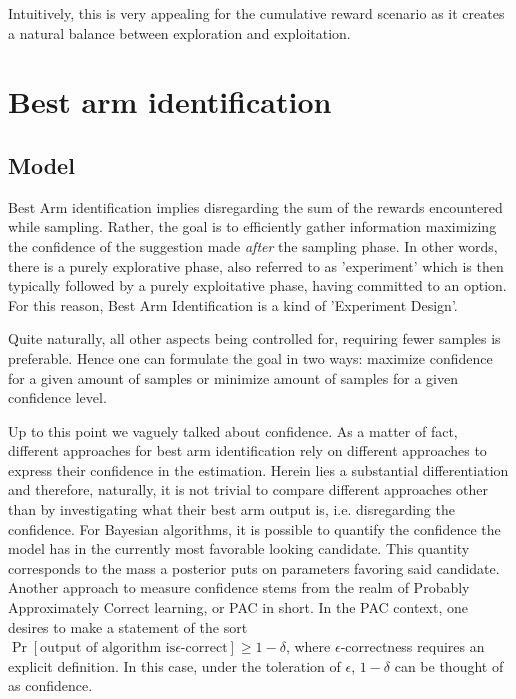 Intuitively, this is very appealing for the cumulative reward scenario as it
creates a natural balance between exploration and exploitation.

\section{Best arm identification}
\subsection{Model}\label{ss:top-1_model}

Best Arm identification implies disregarding the sum of the rewards encountered
while sampling. Rather, the goal is to efficiently gather information maximizing
the confidence of the suggestion made \emph{after} the sampling phase. In other
words, there is a purely explorative phase, also referred to as 'experiment'
which is then typically followed by a purely exploitative phase, having
committed to an option. For this reason, Best Arm Identification is a kind of
'Experiment Design'.

Quite naturally, all other aspects being controlled for, requiring fewer samples
is preferable. Hence one can formulate the goal in two ways: maximize confidence
for a given amount of samples or minimize amount of samples for a given
confidence level.

Up to this point we vaguely talked about confidence. As a matter of fact,
different approaches for best arm identification rely on different approaches to
express their confidence in the estimation. Herein lies a substantial
differentiation and therefore, naturally, it is not trivial to compare different
approaches other than by investigating what their best arm output is, i.e.
disregarding the confidence. For Bayesian algorithms, it is possible to quantify
the confidence the model has in the currently most favorable looking candidate.
This quantity corresponds to the mass a posterior puts on parameters favoring
said candidate. Another approach to measure confidence stems from the realm of
Probably Approximately Correct learning, or PAC in short. In the PAC context,
one desires to make a statement of the sort $\Pr[\text{output of algorithm is
$\epsilon$-correct}] \geq 1 - \delta$, where $\epsilon$-correctness requires an
explicit definition. In this case, under the toleration of $\epsilon$, $1 -
\delta$ can be thought of as confidence.

